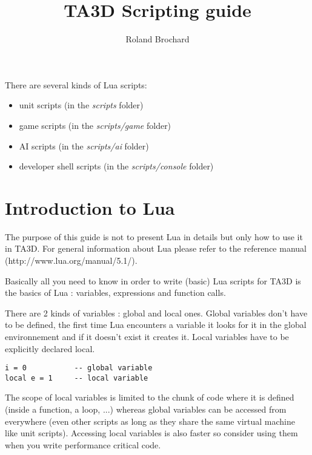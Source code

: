 \documentclass[a4paper,10pt]{article}
\title{TA3D Scripting guide}
\author{Roland Brochard}
\begin{document}
\maketitle


\pagebreak

There are several kinds of Lua scripts:
\begin{itemize}
 \item unit scripts (in the \textit{scripts} folder)
 \item game scripts (in the \textit{scripts/game} folder)
 \item AI scripts (in the \textit{scripts/ai} folder)
 \item developer shell scripts (in the \textit{scripts/console} folder)
\end{itemize}

\section{Introduction to Lua}

The purpose of this guide is not to present Lua in details but only how to use it in TA3D. For general information about Lua please refer to the reference manual (http://www.lua.org/manual/5.1/).

Basically all you need to know in order to write (basic) Lua scripts for TA3D is the basics of Lua : variables, expressions and function calls.

There are 2 kinds of variables : global and local ones. Global variables don't have to be defined, the first time Lua encounters a variable it looks for it in the global environnement and if it doesn't exist it creates it. Local variables have to be explicitly declared local.

\begin{lstlisting}
i = 0           -- global variable
local e = 1     -- local variable
\end{lstlisting}

The scope of local variables is limited to the chunk of code where it is defined (inside a function, a loop, ...) whereas global variables can be accessed from everywhere (even other scripts as long as they share the same virtual machine like unit scripts). Accessing local variables is also faster so consider using them when you write performance critical code.
\end{document}
